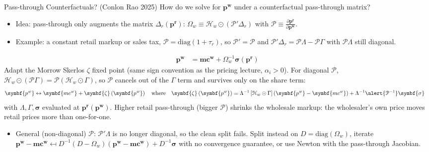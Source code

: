 \documentclass[aspectratio=169,10pt]{beamer}
\begin{document}
\begin{frame}{Pass-through Counterfactuals? (Conlon Rao 2025)}
\footnotesize
How do we solve for $\symbf{p^w}$ under a counterfactual pass-through matrix?
\begin{itemize}
\item Idea: pass-through only augments the matrix $\Delta_r(\symbf{p^r})$: $\Omega_w \equiv \mathcal{H}_{w} \odot \left( \mathcal{P}' \Delta_r \right)$ with $\mathcal{P} \equiv \frac{\partial \symbf{p^r}}{\partial \symbf{p^w}}$.
\item Example: a constant retail markup or sales tax, $\mathcal{P} = \text{diag}(1+\tau_r)$, so $\mathcal{P}' = \mathcal{P}$ and $\mathcal{P}' \Delta_r = \mathcal{P}\Lambda - \mathcal{P}\Gamma$ with $\mathcal{P}\Lambda$ still diagonal.
\end{itemize}
\begin{align*}
\symbf{p^w}  &= \symbf{mc^w} + \Omega_w^{-1} \symbf{\sigma}(\symbf{p^r})
\end{align*}
Adapt the Morrow Skerlos $\zeta$ fixed point (same sign convention as the pricing lecture, $\alpha_i > 0$). For diagonal $\mathcal{P}$, $\mathcal{H}_w \odot (\mathcal{P}\Gamma) = \mathcal{P}(\mathcal{H}_w \odot \Gamma)$, so $\mathcal{P}$ cancels out of the $\Gamma$ term and survives only on the share term:
\begin{align*}
\symbf{p^w} &\leftrightarrow \symbf{mc^w}+\symbf{\zeta}\left(\symbf{p^w}\right) \quad \text{where}\quad
 \symbf{\zeta}\left(\symbf{p^w}\right)=\Lambda^{-1}\left[\mathcal{H}_w \odot  \Gamma\right]\left(\symbf{p^w}-\symbf{mc^w}\right)+\Lambda^{-1} \alert{\mathcal{P}^{-1}} \symbf{\sigma}
\end{align*}
with $\Lambda, \Gamma, \symbf{\sigma}$ evaluated at $\symbf{p^r}(\symbf{p^w})$. Higher retail pass-through (bigger $\mathcal{P}$) shrinks the wholesale markup: the wholesaler's own price moves retail prices more than one-for-one.
\begin{itemize}
\item General (non-diagonal) $\mathcal{P}$: $\mathcal{P}'\Lambda$ is no longer diagonal, so the clean split fails. Split instead on $D = \text{diag}(\Omega_w)$, iterate $\symbf{p^w} - \symbf{mc^w} \mapsfrom D^{-1}(D - \Omega_w)(\symbf{p^w} - \symbf{mc^w}) + D^{-1}\symbf{\sigma}$ with no convergence guarantee, or use Newton with the pass-through Jacobian.
\end{itemize}
\end{frame}
\end{document}
